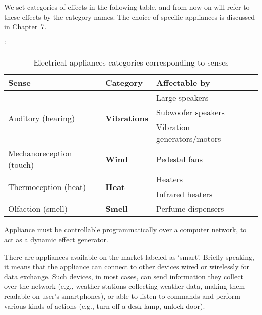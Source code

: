 We set categories of effects in the following table, and from now on will
refer to these effects by the category names. The choice of specific appliances
is discussed in Chapter~7.

  \begin{table}[H]
  \catcode`
  \centering
  \begin{tabular}{|l|l|l|}
  \hline
  \textbf{Sense}                          & \textbf{Category}                    & \textbf{Affectable by}      \\ \hline
  \multirow{3}{*}{Auditory (hearing)}     & \multirow{3}{*}{\textbf{Vibrations}} & Large speakers              \\ \cline{3-3} 
                                          &                                      & Subwoofer speakers          \\ \cline{3-3} 
                                          &                                      & Vibration generators/motors \\ \hline
  Mechanoreception (touch) & \textbf{Wind}                        & Pedestal fans               \\ \hline
  \multirow{2}{*}{Thermoception (heat)}   & \multirow{2}{*}{\textbf{Heat}}       & Heaters                     \\ \cline{3-3} 
                                          &                                      & Infrared heaters            \\ \hline
  Olfaction (smell)                       & \textbf{Smell}                       & Perfume dispensers          \\ \hline
  \end{tabular}
  \caption{Electrical appliances categories corresponding to senses}
  \end{table}

Appliance must be controllable programmatically over a computer network,
to act as a dynamic effect generator.

\pagebreak

There are appliances available on the market labeled as `smart'.
Briefly speaking, it means that the appliance
can connect to other devices wired or wirelessly for data exchange. \cite{wisd}
Such devices, in most cases, can send information they collect over
the network (e.g., weather stations collecting weather data, making them readable
on user’s smartphones), or able to listen to commands and perform various
kinds of actions (e.g., turn off a desk lamp, unlock door).

